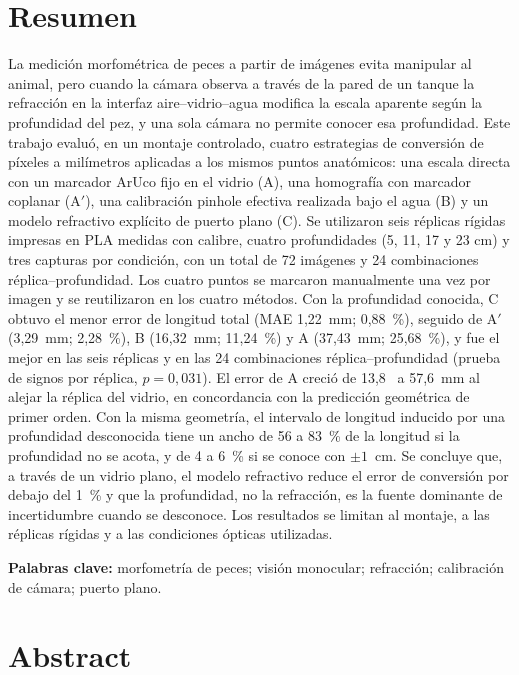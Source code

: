 \documentclass{report}
\newcommand{\Aprime}{A$'$}
\newcommand{\SI}[2]{#1~#2}
\newcommand{\percent}{\%}
\newcommand{\PalabrasClave}{morfometría de peces; visión monocular; refracción; calibración de cámara; puerto plano}
\begin{document}
\chapter*{Resumen}
La medición morfométrica de peces a partir de imágenes evita manipular al animal, pero cuando la cámara observa a través de la pared de un tanque la refracción en la interfaz aire--vidrio--agua modifica la escala aparente según la profundidad del pez, y una sola cámara no permite conocer esa profundidad. Este trabajo evaluó, en un montaje controlado, cuatro estrategias de conversión de píxeles a milímetros aplicadas a los mismos puntos anatómicos: una escala directa con un marcador ArUco fijo en el vidrio (A), una homografía con marcador coplanar (\Aprime), una calibración pinhole efectiva realizada bajo el agua (B) y un modelo refractivo explícito de puerto plano (C). Se utilizaron seis réplicas rígidas impresas en PLA medidas con calibre, cuatro profundidades (5, 11, 17 y 23 cm) y tres capturas por condición, con un total de 72 imágenes y 24 combinaciones réplica--profundidad. Los cuatro puntos se marcaron manualmente una vez por imagen y se reutilizaron en los cuatro métodos. Con la profundidad conocida, C obtuvo el menor error de longitud total (MAE \SI{1,22}{mm}; \SI{0,88}{\percent}), seguido de \Aprime{} (\SI{3,29}{mm}; \SI{2,28}{\percent}), B (\SI{16,32}{mm}; \SI{11,24}{\percent}) y A (\SI{37,43}{mm}; \SI{25,68}{\percent}), y fue el mejor en las seis réplicas y en las 24 combinaciones réplica--profundidad (prueba de signos por réplica, $p = 0{,}031$). El error de A creció de \SI{13,8}{} a \SI{57,6}{mm} al alejar la réplica del vidrio, en concordancia con la predicción geométrica de primer orden. Con la misma geometría, el intervalo de longitud inducido por una profundidad desconocida tiene un ancho de 56 a 83~\% de la longitud si la profundidad no se acota, y de 4 a 6~\% si se conoce con $\pm 1$~cm. Se concluye que, a través de un vidrio plano, el modelo refractivo reduce el error de conversión por debajo del 1~\% y que la profundidad, no la refracción, es la fuente dominante de incertidumbre cuando se desconoce. Los resultados se limitan al montaje, a las réplicas rígidas y a las condiciones ópticas utilizadas.

\noindent\textbf{Palabras clave:} \PalabrasClave.


\chapter*{Abstract}
\end{document}
